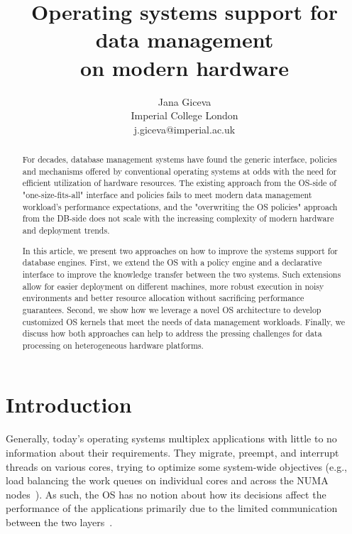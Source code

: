 \documentclass[11pt]{article}
\begin{document}
\title{Operating systems support for data management \\ on modern hardware}
\author{Jana Giceva \\ Imperial College London \\ j.giceva@imperial.ac.uk}
\maketitle

\begin{abstract}
For decades, database management systems have found the generic interface, policies and mechanisms offered by 
conventional operating systems at odds with the need for efficient utilization of hardware resources. The 
existing approach from the OS-side of "one-size-fits-all" interface and policies fails to meet modern data 
management workload's performance expectations, and the "overwriting the OS policies" approach from the 
DB-side does not scale with the increasing complexity of modern hardware and deployment trends.
 
In this article, we present two approaches on how to improve the systems support for database engines. First, 
we extend the OS with a policy engine and a declarative interface to improve the knowledge transfer between 
the two systems. Such extensions allow for easier deployment on different machines, more robust execution 
in noisy environments and better resource allocation without sacrificing performance guarantees. Second, 
we show how we leverage a novel OS architecture to develop customized OS kernels that meet the needs of 
data management workloads. Finally, we discuss how both approaches can help to address the pressing 
challenges for data processing on heterogeneous hardware platforms.
\end{abstract}

%

\section{Introduction}

Generally, today's operating systems multiplex applications with little to no information 
about their requirements. They migrate, preempt, and interrupt threads on various cores,
trying to optimize some system-wide objectives (e.g., load balancing the work queues
on individual cores and across the NUMA nodes~\cite{Lozi:eurosys16}). As such, the OS
has no notion about how its decisions affect the performance of the applications 
primarily due to the limited communication between the two layers~\cite{cod:2013}. 
\end{document}

